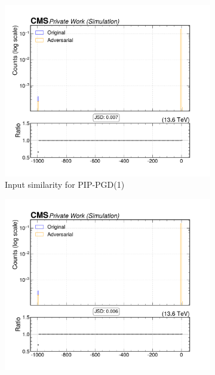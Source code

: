 \begin{figure}[htbp]
  \centering
  \begin{subfigure}[t]{0.32\textwidth}
    \includegraphics[width=\linewidth]{media/output/features/compare/combined_it_1/cmp_global_features_TagVarCSV_trackSip3dValAboveCharm.pdf}
    \caption*{Input similarity for PIP-PGD(1)}
  \end{subfigure}\hfill
  \begin{subfigure}[t]{0.32\textwidth}
    \includegraphics[width=\linewidth]{media/output/features/compare/combined_it_2/cmp_global_features_TagVarCSV_trackSip3dValAboveCharm.pdf}

\end{subfigure}
\end{figure}
